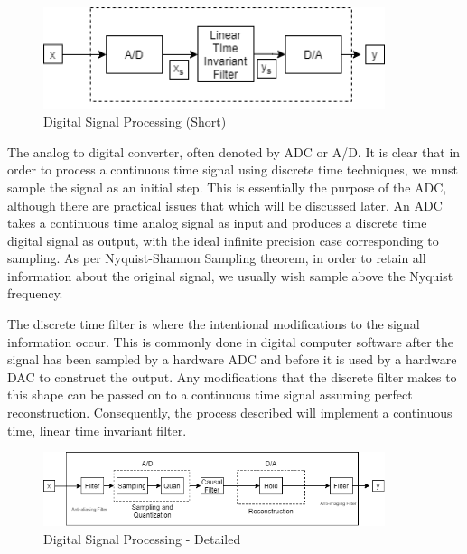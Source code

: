 \documentclass{article}
\begin{document}
\begin{figure}[htbp]
    \begin{center}
    	\includegraphics[width=100mm, angle=0,rotate=0]{figures/adc_dac (1).png}
    \end{center}
        \caption{Digital Signal Processing (Short)}
\end{figure}

The analog to digital converter, often denoted by ADC or A/D. It is clear that in order to process a continuous time signal using discrete time techniques, we must sample the signal as an initial step. This is essentially the purpose of the ADC, although there are practical issues that which will be discussed later. An ADC takes a continuous time analog signal as input and produces a discrete time digital signal as output, with the ideal infinite precision case corresponding to sampling. As per Nyquist-Shannon Sampling theorem, in order to retain all information about the original signal, we usually wish sample above the Nyquist frequency. 

The discrete time filter is where the intentional modifications to the signal information occur. This is commonly done in digital computer software after the signal has been sampled by a hardware ADC and before it is used by a hardware DAC to construct the output. Any modifications that the discrete filter makes to this shape can be passed on to a continuous time signal assuming perfect reconstruction. Consequently, the process described will implement a continuous time, linear time invariant filter.


\begin{figure}[htbp]
    \begin{center}
    	\includegraphics[width=100mm, angle=0,rotate=0]{figures/adc_dac_complete.png}
    \end{center}
        \caption{Digital Signal Processing - Detailed}
\end{figure}
\end{document}
